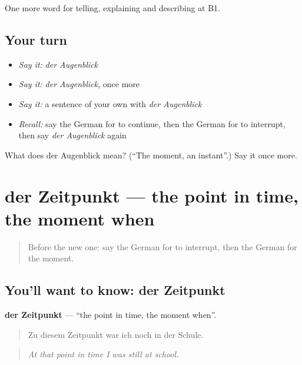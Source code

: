 \begin{grammarlens}[title={What you've built}]
One more word for telling, explaining and describing at B1.
\end{grammarlens}

\subsection*{Your turn}
\begin{itemize}
\raggedright
  \item \emph{Say it:} \emph{der Augenblick}
  \item \emph{Say it:} \emph{der Augenblick}, once more
  \item \emph{Say it:} a sentence of your own with \emph{der Augenblick}
  \item \emph{Recall:} say the German for to continue, then the German for to interrupt, then say \emph{der Augenblick} again
\end{itemize}

\begin{tcolorbox}[breakable,colback=teal!4,colframe=teal!35!black,title={Before you move on}]
What does der Augenblick mean? (\textquotedblleft{}The moment, an instant\textquotedblright{}.) Say it once more.
\end{tcolorbox}
\section[der Zeitpunkt]{der Zeitpunkt — the point in time, the moment when}

\label{lesson:GE-C268-zeitpunkt}



\begin{quote}
Before the new one: say the German for to interrupt, then the German for the moment.
\end{quote}

\subsection*{You'll want to know: der Zeitpunkt}
\textbf{der Zeitpunkt} — \textquotedblleft{}the point in time, the moment when\textquotedblright{}.

\begin{quote}
Zu diesem Zeitpunkt war ich noch in der Schule.
\end{quote}

\begin{quote}
\emph{At that point in time I was still at school.}
\end{quote}

